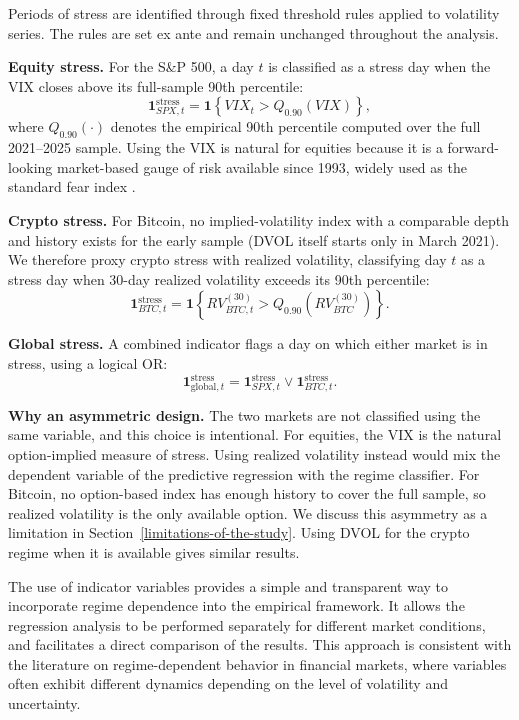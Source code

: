 \documentclass[11pt,a4paper,openany]{report}
\begin{document}
Periods of stress are identified through fixed threshold rules applied
to volatility series. The rules are set ex ante and remain unchanged
throughout the analysis.

\textbf{Equity stress.} For the S\&P 500, a day $t$ is classified as a
stress day when the VIX closes above its full-sample 90th percentile:
\begin{equation}
\mathbf{1}^{\text{stress}}_{SPX,t} = \mathbf{1}\!\left\{ VIX_t > Q_{0.90}(VIX) \right\},
\label{eq:stress_spx}
\end{equation}
where $Q_{0.90}(\cdot)$ denotes the empirical 90th percentile computed
over the full 2021--2025 sample. Using the VIX is natural for equities
because it is a forward-looking market-based gauge of risk available
since 1993, widely used as the standard fear index \citep{whaley2009}.

\textbf{Crypto stress.} For Bitcoin, no implied-volatility index with a
comparable depth and history exists for the early sample (DVOL itself
starts only in March 2021). We therefore proxy crypto stress with
realized volatility, classifying day $t$ as a stress day when 30-day
realized volatility exceeds its 90th percentile:
\begin{equation}
\mathbf{1}^{\text{stress}}_{BTC,t} = \mathbf{1}\!\left\{ RV^{(30)}_{BTC,t} > Q_{0.90}(RV^{(30)}_{BTC}) \right\}.
\label{eq:stress_btc}
\end{equation}

\textbf{Global stress.} A combined indicator flags a day on which either
market is in stress, using a logical OR:
\begin{equation}
\mathbf{1}^{\text{stress}}_{\text{global},t} = \mathbf{1}^{\text{stress}}_{SPX,t} \vee \mathbf{1}^{\text{stress}}_{BTC,t}.
\label{eq:stress_global}
\end{equation}

\textbf{Why an asymmetric design.} The two markets are not classified
using the same variable, and this choice is intentional. For equities,
the VIX is the natural option-implied measure of stress. Using
realized volatility instead would mix the dependent variable of the
predictive regression with the regime classifier. For Bitcoin, no
option-based index has enough history to cover the full sample, so
realized volatility is the only available option. We discuss this
asymmetry as a limitation in
Section~\ref{limitations-of-the-study}. Using DVOL for the crypto
regime when it is available gives similar results.

The use of indicator variables provides a simple and transparent way to
incorporate regime dependence into the empirical framework. It allows
the regression analysis to be performed separately for different market
conditions, and facilitates a direct comparison of the results. This
approach is consistent with the literature on regime-dependent behavior
in financial markets, where variables often exhibit different dynamics
depending on the level of volatility and uncertainty.
\end{document}

